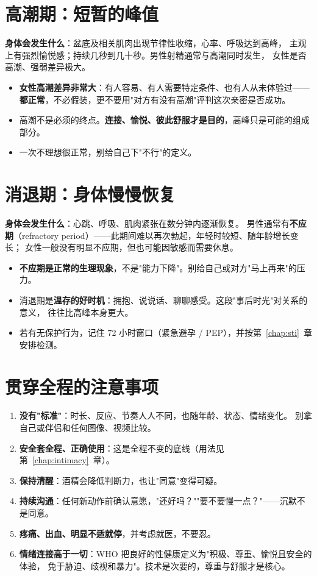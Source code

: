 \section{高潮期：短暂的峰值}

\textbf{身体会发生什么}：盆底及相关肌肉出现节律性收缩，心率、呼吸达到高峰，
主观上有强烈愉悦感；持续几秒到几十秒。男性射精通常与高潮同时发生，
女性是否高潮、强弱差异极大。

\begin{itemize}[leftmargin=2em]
  \item \textbf{女性高潮差异非常大}：有人容易、有人需要特定条件、也有人从未体验过——
        \textbf{都正常}，不必假装，更不要用"对方有没有高潮"评判这次亲密是否成功。
  \item 高潮不是必须的终点。\textbf{连接、愉悦、彼此舒服才是目的}，高峰只是可能的组成部分。
  \item 一次不理想很正常，别给自己下"不行"的定义。
\end{itemize}

\section{消退期：身体慢慢恢复}

\textbf{身体会发生什么}：心跳、呼吸、肌肉紧张在数分钟内逐渐恢复。
男性通常有\textbf{不应期}（refractory period）——此期间难以再次勃起，年轻时较短、随年龄增长变长；
女性一般没有明显不应期，但也可能因敏感而需要休息。

\begin{itemize}[leftmargin=2em]
  \item \textbf{不应期是正常的生理现象}，不是"能力下降"。别给自己或对方"马上再来"的压力。
  \item 消退期是\textbf{温存的好时机}：拥抱、说说话、聊聊感受。这段"事后时光"对关系的意义，
        往往比高峰本身更大。
  \item 若有无保护行为，记住 72 小时窗口（紧急避孕 / PEP），并按第~\ref{chap:sti}~章安排检测。
\end{itemize}

\section{贯穿全程的注意事项}

\begin{enumerate}[leftmargin=2em,itemsep=0.3em]
  \item \textbf{没有"标准"}：时长、反应、节奏人人不同，也随年龄、状态、情绪变化。
        别拿自己或伴侣和任何图像、视频比较。
  \item \textbf{安全套全程、正确使用}：这是全程不变的底线（用法见第~\ref{chap:intimacy}~章）。
  \item \textbf{保持清醒}：酒精会降低判断力，也让"同意"变得可疑。
  \item \textbf{持续沟通}：任何新动作前确认意愿，"还好吗？""要不要慢一点？"——沉默不是同意。
  \item \textbf{疼痛、出血、明显不适就停}，并考虑就医，不要忍。
  \item \textbf{情绪连接高于一切}：WHO 把良好的性健康定义为"积极、尊重、愉悦且安全的体验，
        免于胁迫、歧视和暴力"。技术是次要的，尊重与舒服才是核心。
\end{enumerate}

